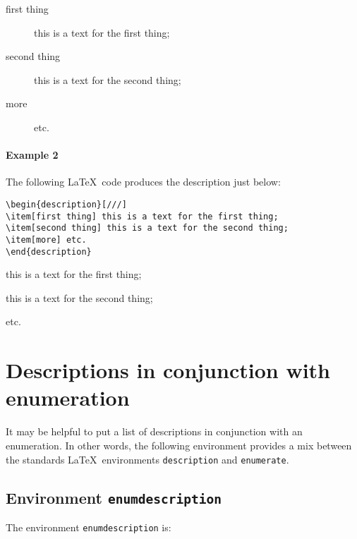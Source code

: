 \documentclass[book,taskpackage,specpackage,codepackage]{upmethodology-document}
\begin{document}
\begin{description}
\item[first thing] this is a text for the first thing;
\item[second thing] this is a text for the second thing;
\item[more] etc.
\end{description}

\paragraph{Example 2} The following \LaTeX~code produces the description just below:
\begin{verbatim}
\begin{description}[///]
\item[first thing] this is a text for the first thing;
\item[second thing] this is a text for the second thing;
\item[more] etc.
\end{description}
\end{verbatim}

\begin{description}[///]
\item[first thing] this is a text for the first thing;
\item[second thing] this is a text for the second thing;
\item[more] etc.
\end{description}

\section{Descriptions in conjunction with enumeration}

It may be helpful to put a list of descriptions in conjunction with an enumeration.
In other words, the following environment provides a mix between the standards \LaTeX~environments \texttt{description} and \texttt{enumerate}.

\subsection{Environment \texttt{enumdescription}}

The environment \texttt{enumdescription} is:
\end{document}
